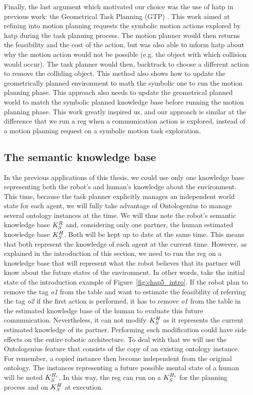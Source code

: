 Finally, the last argument which motivated our choice was the use of \acrshort{hatp} in previous work: the Geometrical Task Planning (GTP) \cite{gharbi_2015_combining}. This work aimed at refining into motion planning requests the symbolic motion actions explored by \acrshort{hatp} during the task planning process. The motion planner would then returns the feasibility and the cost of the action, but was also able to inform \acrshort{hatp} about why the motion action would not be possible (e.g. the object with which collision would occur). The task planner would then, backtrack to choose a different action to remove the colliding object. This method also shows how to update the geometrically planned environment to math the symbolic one to run the motion planning phase. This approach also needs to update the geometrical planned world to match the symbolic planned knowledge base before running the motion planning phase. This work greatly inspired us, and our approach is similar at the difference that we run a \acrshort{reg} when a communication action is explored, instead of a motion planning request on a symbolic motion task exploration.

\subsection{The semantic knowledge base}

In the previous applications of this thesis, we could use only one knowledge base representing both the robot's and human's knowledge about the environment. This time, because the task planner explicitly manages an independent world state for each agent, we will fully take advantage of Ontologenius to manage several ontology instances at the time. We will thus note the robot's semantic knowledge base $K_S^R$ and, considering only one partner, the human estimated knowledge base $K_S^H$. Both will be kept up to date at the same time. This means that both represent the knowledge of each agent at the current time. However, as explained in the introduction of this section, we need to run the \acrshort{reg} on a knowledge base that will represent what the robot believes that its partner will know about the future states of the environment. In other words, take the initial state of the introduction example of Figure~\ref{fig:chap5_intro}. If the robot plan to remove the tag \textit{o1} from the table and want to estimate the feasibility of referring the tag \textit{o2} if the first action is performed, it has to remove \textit{o1} from the table in the estimated knowledge base of the human to evaluate this future communication. Nevertheless, it can not modify $K_S^H$ as it represents the current estimated knowledge of its partner. Performing such modification could have side effects on the entire robotic architecture. To deal with that we will use the Ontologenius feature that consists of the copy of an existing ontology instance. For remember, a copied instance then become independent from the original ontology. The instances representing a future possible mental state of a human will be noted $K_S^{H_i}$. In this way, the \acrshort{reg} can run on a $K_S^{H_i}$ for the planning process and on $K_S^H$ at execution.

